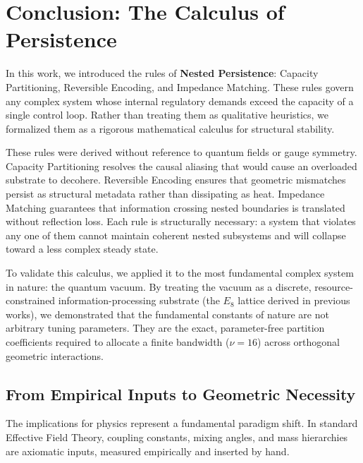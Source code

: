 \section{Conclusion: The Calculus of Persistence}

In this work, we introduced the rules of \textbf{Nested Persistence}: Capacity Partitioning, Reversible Encoding, and Impedance Matching. These rules govern any complex system whose internal regulatory demands exceed the capacity of a single control loop. Rather than treating them as qualitative heuristics, we formalized them as a rigorous mathematical calculus for structural stability.

These rules were derived without reference to quantum fields or gauge symmetry. Capacity Partitioning resolves the causal aliasing that would cause an overloaded substrate to decohere. Reversible Encoding ensures that geometric mismatches persist as structural metadata rather than dissipating as heat. Impedance Matching guarantees that information crossing nested boundaries is translated without reflection loss. Each rule is structurally necessary: a system that violates any one of them cannot maintain coherent nested subsystems and will collapse toward a less complex steady state.

To validate this calculus, we applied it to the most fundamental complex system in nature: the quantum vacuum. By treating the vacuum as a discrete, resource-constrained information-processing substrate (the $E_8$ lattice derived in previous works), we demonstrated that the fundamental constants of nature are not arbitrary tuning parameters. They are the exact, parameter-free partition coefficients required to allocate a finite bandwidth ($\nu=16$) across orthogonal geometric interactions.

\subsection{From Empirical Inputs to Geometric Necessity}

The implications for physics represent a fundamental paradigm shift. In standard Effective Field Theory, coupling constants, mixing angles, and mass hierarchies are axiomatic inputs, measured empirically and inserted by hand.

